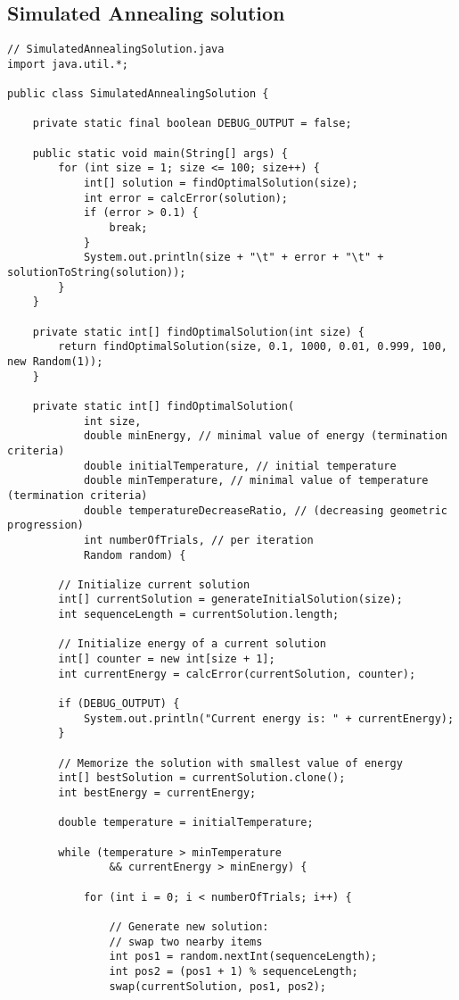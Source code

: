 \documentclass{article}
\begin{document}
\clearpage

\subsection{Simulated Annealing solution} \label{simulated-annealing-solution}

\begin{lstlisting}
// SimulatedAnnealingSolution.java
import java.util.*;

public class SimulatedAnnealingSolution {

	private static final boolean DEBUG_OUTPUT = false;

	public static void main(String[] args) {
		for (int size = 1; size <= 100; size++) {
			int[] solution = findOptimalSolution(size);
			int error = calcError(solution);
			if (error > 0.1) {
				break;
			}
			System.out.println(size + "\t" + error + "\t" + solutionToString(solution));
		}
	}

	private static int[] findOptimalSolution(int size) {
		return findOptimalSolution(size, 0.1, 1000, 0.01, 0.999, 100, new Random(1));
	}

	private static int[] findOptimalSolution(
			int size,
			double minEnergy, // minimal value of energy (termination criteria)
			double initialTemperature, // initial temperature
			double minTemperature, // minimal value of temperature (termination criteria)
			double temperatureDecreaseRatio, // (decreasing geometric progression)
			int numberOfTrials, // per iteration
			Random random) {

		// Initialize current solution
		int[] currentSolution = generateInitialSolution(size);
		int sequenceLength = currentSolution.length;

		// Initialize energy of a current solution
		int[] counter = new int[size + 1];
		int currentEnergy = calcError(currentSolution, counter);

		if (DEBUG_OUTPUT) {
			System.out.println("Current energy is: " + currentEnergy);
		}

		// Memorize the solution with smallest value of energy
		int[] bestSolution = currentSolution.clone();
		int bestEnergy = currentEnergy;

		double temperature = initialTemperature;

		while (temperature > minTemperature
				&& currentEnergy > minEnergy) {

			for (int i = 0; i < numberOfTrials; i++) {

				// Generate new solution:
				// swap two nearby items
				int pos1 = random.nextInt(sequenceLength);
				int pos2 = (pos1 + 1) % sequenceLength;
				swap(currentSolution, pos1, pos2);


\end{lstlisting}
\end{document}
